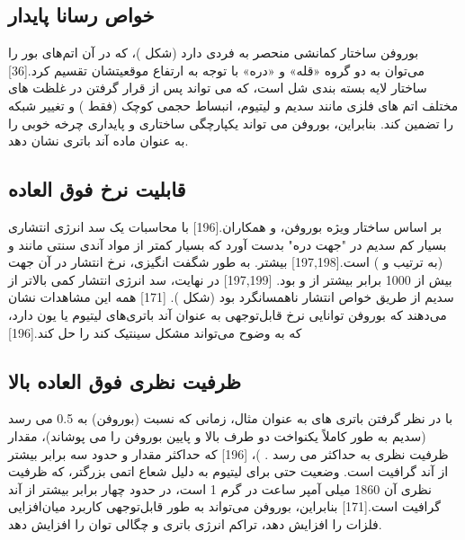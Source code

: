 \subsection{خواص رسانا پایدار}
بوروفن  ساختار کمانشی منحصر به فردی دارد (شکل )، که در آن اتم‌های بور را می‌توان به دو گروه «قله» و «دره» با توجه به ارتفاع موقعیتشان تقسیم کرد.\cite{mannixSynthesisBorophenesAnisotropic2015}[36] ساختار لایه بسته بندی شل است، که می تواند پس از قرار گرفتن در غلظت های مختلف اتم های فلزی مانند سدیم و لیتیوم، انبساط حجمی کوچک (فقط ) و تغییر شبکه را تضمین کند. بنابراین، بوروفن می تواند یکپارچگی ساختاری و پایداری چرخه خوبی را به عنوان ماده آند باتری نشان دهد.
\subsection{قابلیت نرخ فوق العاده}
بر اساس ساختار ویژه بوروفن،  و همکاران.\cite{shiInitioPredictionBorophene2016}[196] با محاسبات  یک سد انرژی انتشاری بسیار کم  سدیم در "جهت دره" بدست آورد که بسیار کمتر از مواد آندی سنتی مانند  و  (به ترتیب  و ) است.[197,198] بیشتر. به طور شگفت انگیزی، نرخ انتشار در آن جهت بیش از 1000 برابر بیشتر از  و  بود. \cite{baggettoIntrinsicThermodynamicKinetic2013, gonzeFirstprinciplesComputationMaterial2002, panSodiumStorageTransport2013}[197,199] در نهایت، سد انرژی انتشار  کمی بالاتر از سدیم از طریق خواص انتشار ناهمسانگرد بود (شکل ). [171] همه این مشاهدات نشان می‌دهند که بوروفن توانایی نرخ قابل‌توجهی به عنوان آند باتری‌های لیتیوم یا یون دارد، که به وضوح می‌تواند مشکل سینتیک کند را حل کند.\cite{shiInitioPredictionBorophene2016}[196]
\subsection{ظرفیت نظری فوق العاده بالا}
با در نظر گرفتن باتری های  به عنوان مثال، زمانی که نسبت  (بوروفن) به 0.5 می رسد (سدیم به طور کاملاً یکنواخت دو طرف بالا و پایین بوروفن را می پوشاند)، مقدار ظرفیت نظری به حداکثر می رسد . )، \cite{shiInitioPredictionBorophene2016}[196] که حداکثر مقدار و حدود سه برابر بیشتر از آند گرافیت  است. وضعیت حتی برای لیتیوم  به دلیل شعاع اتمی بزرگتر، که ظرفیت نظری آن 1860 میلی آمپر ساعت در گرم 1 است، در حدود چهار برابر بیشتر از آند گرافیت است.\cite{jiangBorophenePromisingAnode2016}[171] بنابراین، بوروفن می‌تواند به طور قابل‌توجهی کاربرد میان‌افزایی فلزات را افزایش دهد، تراکم انرژی باتری و چگالی توان را افزایش دهد.


